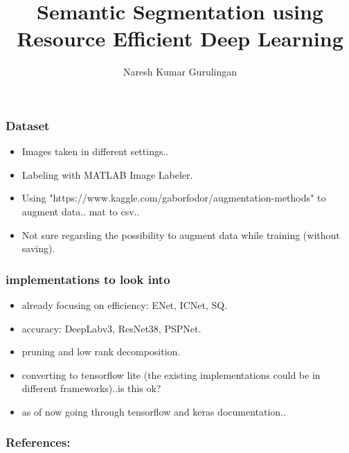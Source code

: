 \documentclass[10pt]
{beamer}
\title{Semantic Segmentation using Resource Efficient Deep Learning}
\author{Naresh Kumar Gurulingan}
\begin{document}
\begin{frame}
\titlepage
\end{frame}

\begin{frame}
	\frametitle{Dataset}
		\begin{itemize}
			\item Images taken in different settings..
			\item Labeling with MATLAB Image Labeler.
			\item Using "https://www.kaggle.com/gaborfodor/augmentation-methods" to augment data.. mat to csv..
			\item Not sure regarding the possibility to augment data while training (without saving).
		\end{itemize}
\end{frame}

\begin{frame}
	\frametitle{implementations to look into}
	\begin{itemize}
		\item already focusing on efficiency: ENet, ICNet, SQ.
		\item accuracy: DeepLabv3, ResNet38, PSPNet.
		\item pruning and low rank decomposition.
		\item converting to tensorflow lite (the existing implementations could be in different frameworks)..is this ok?
		\item as of now going through tensorflow and keras documentation..
	\end{itemize}
\end{frame}

\begin{frame}
	\frametitle{References:}
	\begin{thebibliography}{9}

	\end{thebibliography}
\end{frame}
\end{document}
